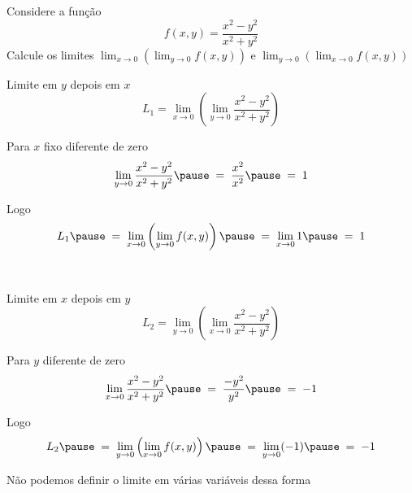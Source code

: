 \begin{question}
  Considere a função
  \[
    f(x, y) = \frac{x^2 - y^2}{x^2 + y^2}
  \]
  Calcule os limites
  \quad
  \(
    \lim_{x \to 0} \left(\lim_{y \to 0} f(x,y)\right)
  \)
  \quad
  e
  \quad
  \(
    \lim_{y \to 0} \left(\lim_{x \to 0} f(x,y)\right)
  \)
\end{question}

\begin{resolution}{Limite em $y$ depois em $x$}
  \[
    L_1
    = \lim_{x \to 0} \left( \lim_{y \to 0} \frac{x^2 - y^2}{x^2 + y^2} \right)
  \]

  \pause
  Para $x$ fixo diferente de zero
  \[
    \lim_{y \to 0} \frac{x^2 - y^2}{x^2 + y^2}
    \pause
    \;=\; \frac{x^2}{x^2}
    \pause
    \;=\; 1
  \]

  \pause
  Logo
  \[
    L_1
    \pause
    \;=\; \lim_{x \to 0} \left(\lim_{y \to 0} f(x,y)\right)
    \pause
    \;=\; \lim_{x \to 0} 1
    \pause
    \;=\; 1
  \]

  ~
\end{resolution}

\begin{resolution}{Limite em $x$ depois em $y$}
  \[
    L_2
    = \lim_{y \to 0} \left( \lim_{x \to 0} \frac{x^2 - y^2}{x^2 + y^2} \right)
  \]

  \pause
  Para $y$ diferente de zero
  \[
    \lim_{x \to 0} \frac{x^2 - y^2}{x^2 + y^2}
    \pause
    \;=\; \frac{-y^2}{y^2}
    \pause
    \;=\; -1
  \]

  \pause
  Logo
  \[
    L_2
    \pause
    \;=\; \lim_{y \to 0} \left(\lim_{x \to 0} f(x,y)\right)
    \pause
    \;=\; \lim_{y \to 0} (-1)
    \pause
    \;=\; -1
  \]

  \pause
  Não podemos definir o limite em várias variáveis dessa forma
\end{resolution}

